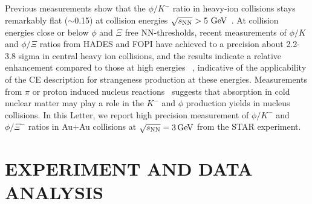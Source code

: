 \documentclass[aps,tightenlines,superscriptaddress,twocolumn]{revtex4-1}
\begin{document}
Previous measurements 
show that the $\phi/K^-$ ratio in heavy-ion collisions stays remarkably flat ($\sim$0.15) at collision energies ${\sqrt{s_{\rm NN}} > \textup{5 GeV}}$~\cite{E917_phi:2004,NA49_phi:2008,star_bes_strangeness:2020}. 
At collision energies close or below $\phi$ and $\Xi$ free NN-thresholds, recent measurements of $\phi/K$ and $\phi/\Xi$ ratios from HADES and FOPI have achieved to a precision about 2.2-3.8 sigma in central heavy ion collisions, and the results indicate a relative enhancement compared to those at high energies
~\cite{HADES_phi_ArKCl:2009,FOPI_phi_NiNi:2015,FOPI_phi_AlAl:2016,HADES_phi_AuAu:2018}, indicative of the applicability of the CE description for strangeness production at these energies. 
Measurements from $\pi$ or proton induced nucleus reactions~\cite{HADES_PRL_pA:2007,HADES_PRL_W_C:2019}
suggests that absorption in cold nuclear matter may play a role in the $K^-$ and $\phi$ production yields in nucleus collisions. 
In this Letter, we report high precision measurement of $\phi/K^-$ and $\phi/\Xi^-$ ratios in Au+Au collisions at ${\sqrt{s_{\rm NN}} = \rm{3\,GeV}}$ from the STAR experiment.

\section{EXPERIMENT AND DATA ANALYSIS }
\label{dataanalysis}
\end{document}
